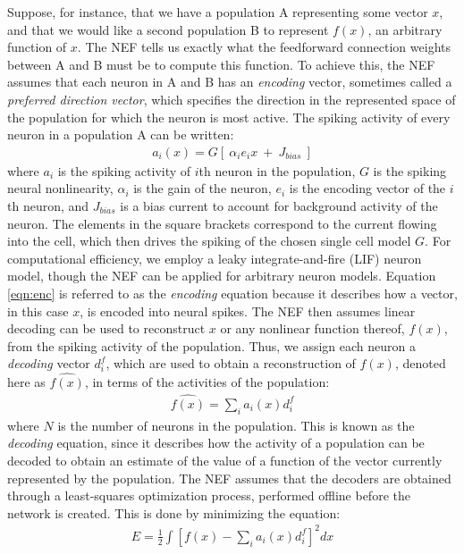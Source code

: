 \documentclass[10pt,letterpaper]{article}
\begin{document}
Suppose, for instance, that we have a population A representing some vector $x$, and that we would like a second population B to represent $f(x)$, an arbitrary function of $x$. The NEF tells us exactly what the feedforward connection weights between A and B must be to compute this function. To achieve this, the NEF assumes that each neuron in A and B has an \textit{encoding} vector, sometimes called a \textit{preferred direction vector}, which specifies the direction in the represented space of the population for which the neuron is most active. The spiking activity of every neuron in a population A can be written:
\begin{align}
a_i (x) = G [\ \alpha_i e_i x\ +\ J_{bias}\ ]\label{eqn:enc}
\end{align}
where $a_i$ is the spiking activity of $i$th neuron in the population, $G$ is the spiking neural nonlinearity, $\alpha_i$ is the gain of the neuron, $e_i$ is the encoding vector of the $i$th neuron, and $J_{bias}$ is a bias current to account for background activity of the neuron. The elements in the square brackets correspond to the current flowing into the cell, which then drives the spiking of the chosen single cell model $G$. For computational efficiency, we employ a leaky integrate-and-fire (LIF) neuron model, though the NEF can be applied for arbitrary neuron models. Equation \eqref{eqn:enc} is referred to as the \textit{encoding} equation because it describes how a vector, in this case $x$, is encoded into neural spikes. The NEF then assumes linear decoding can be used to reconstruct $x$ or any nonlinear function thereof, $f(x)$, from the spiking activity of the population. Thus, we assign each neuron a
\textit{decoding} vector $d^f_i$, which are used to obtain a reconstruction of $f(x)$, denoted here as $\widehat{f(x)}$, in terms of the activities of the population:
\begin{align}
\widehat{f(x)} = \sum_i a_i(x) d^f_i \label{eqn:dec}
\end{align}
where $N$ is the number of neurons in the population. This is known as the \textit{decoding} equation, since it describes how the activity of a population can be decoded to obtain an estimate of the value of a function of the vector currently represented by the population. The NEF assumes that the decoders are obtained through a least-squares optimization process, performed offline before the network is created. This is done by minimizing the equation:
\begin{align}
E = \frac{1}{2}\int[f(x) - \sum_i a_i(x) d^f_i]^2dx\label{eqn:error}
\end{align}
\end{document}
